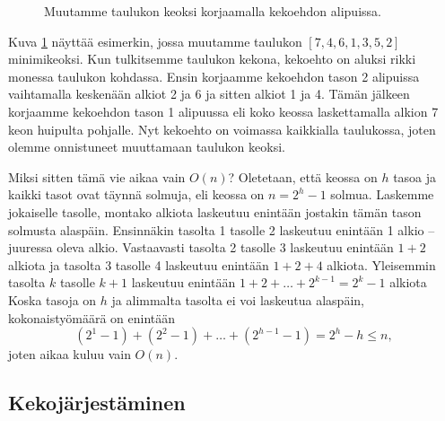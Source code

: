 \begin{figure}
\caption{Muutamme taulukon keoksi korjaamalla kekoehdon alipuissa.}
\label{fig:taukek}
\end{figure}

Kuva \ref{fig:taukek} näyttää esimerkin, jossa muutamme taulukon
$[7,4,6,1,3,5,2]$ minimikeoksi.
Kun tulkitsemme taulukon kekona, kekoehto on aluksi
rikki monessa taulukon kohdassa.
Ensin korjaamme kekoehdon tason 2 alipuissa vaihtamalla
keskenään alkiot 2 ja 6 ja sitten alkiot 1 ja 4.
Tämän jälkeen korjaamme kekoehdon tason 1 alipuussa
eli koko keossa laskettamalla alkion 7 keon huipulta pohjalle.
Nyt kekoehto on voimassa kaikkialla taulukossa,
joten olemme onnistuneet muuttamaan taulukon keoksi.

Miksi sitten tämä vie aikaa vain $O(n)$?
Oletetaan, että keossa on $h$ tasoa ja kaikki
tasot ovat täynnä solmuja, eli keossa on $n=2^h-1$ solmua.
Laskemme jokaiselle tasolle, montako alkiota laskeutuu
enintään jostakin tämän tason solmusta alaspäin.
Ensinnäkin tasolta 1 tasolle 2 laskeutuu enintään 1 alkio --
juuressa oleva alkio.
Vastaavasti
tasolta 2 tasolle 3 laskeutuu enintään $1+2$ alkiota
ja
tasolta 3 tasolle 4 laskeutuu enintään $1+2+4$ alkiota.
Yleisemmin tasolta $k$ tasolle $k+1$ laskeutuu
enintään $1+2+\dots+2^{k-1} = 2^k-1$ alkiota
Koska tasoja on $h$ ja alimmalta tasolta ei voi laskeutua alaspäin,
kokonaistyömäärä on enintään
\[(2^1-1)+(2^2-1)+\dots+(2^{h-1}-1)=2^h-h \le n,\]
joten aikaa kuluu vain $O(n)$.

\subsection{Kekojärjestäminen}

